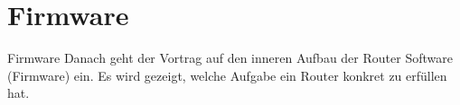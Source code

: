\section{Firmware}

\begin{frame}{Firmware}
Danach geht der Vortrag auf den inneren Aufbau der Router Software
(Firmware) ein. Es wird gezeigt, welche Aufgabe ein Router konkret
zu erfüllen hat.
\end{frame}
